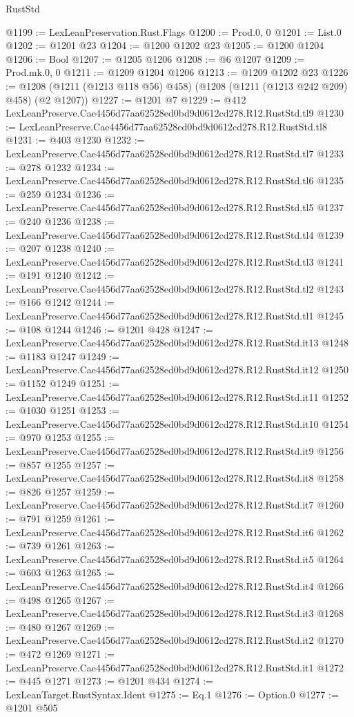 \begin{lexlean}{RustStd}
\begin{coremodule}
@1199 := LexLeanPreservation.Rust.Flags
@1200 := Prod.{0, 0}
@1201 := List.{0}
@1202 := @1201 @23
@1204 := @1200 @1202 @23
@1205 := @1200 @1204
@1206 := Bool
@1207 := @1205 @1206
@1208 := @6 @1207
@1209 := Prod.mk.{0, 0}
@1211 := @1209 @1204 @1206
@1213 := @1209 @1202 @23
@1226 := @1208 (@1211 (@1213 @118 @56) @458) (@1208 (@1211 (@1213 @242 @209) @458) (@2 @1207))
@1227 := @1201 @7
@1229 := @412 LexLeanPreserve.Cae4456d77aa62528ed0bd9d0612cd278.R12.RustStd.tl9
@1230 := LexLeanPreserve.Cae4456d77aa62528ed0bd9d0612cd278.R12.RustStd.tl8
@1231 := @403 @1230
@1232 := LexLeanPreserve.Cae4456d77aa62528ed0bd9d0612cd278.R12.RustStd.tl7
@1233 := @278 @1232
@1234 := LexLeanPreserve.Cae4456d77aa62528ed0bd9d0612cd278.R12.RustStd.tl6
@1235 := @259 @1234
@1236 := LexLeanPreserve.Cae4456d77aa62528ed0bd9d0612cd278.R12.RustStd.tl5
@1237 := @240 @1236
@1238 := LexLeanPreserve.Cae4456d77aa62528ed0bd9d0612cd278.R12.RustStd.tl4
@1239 := @207 @1238
@1240 := LexLeanPreserve.Cae4456d77aa62528ed0bd9d0612cd278.R12.RustStd.tl3
@1241 := @191 @1240
@1242 := LexLeanPreserve.Cae4456d77aa62528ed0bd9d0612cd278.R12.RustStd.tl2
@1243 := @166 @1242
@1244 := LexLeanPreserve.Cae4456d77aa62528ed0bd9d0612cd278.R12.RustStd.tl1
@1245 := @108 @1244
@1246 := @1201 @428
@1247 := LexLeanPreserve.Cae4456d77aa62528ed0bd9d0612cd278.R12.RustStd.it13
@1248 := @1183 @1247
@1249 := LexLeanPreserve.Cae4456d77aa62528ed0bd9d0612cd278.R12.RustStd.it12
@1250 := @1152 @1249
@1251 := LexLeanPreserve.Cae4456d77aa62528ed0bd9d0612cd278.R12.RustStd.it11
@1252 := @1030 @1251
@1253 := LexLeanPreserve.Cae4456d77aa62528ed0bd9d0612cd278.R12.RustStd.it10
@1254 := @970 @1253
@1255 := LexLeanPreserve.Cae4456d77aa62528ed0bd9d0612cd278.R12.RustStd.it9
@1256 := @857 @1255
@1257 := LexLeanPreserve.Cae4456d77aa62528ed0bd9d0612cd278.R12.RustStd.it8
@1258 := @826 @1257
@1259 := LexLeanPreserve.Cae4456d77aa62528ed0bd9d0612cd278.R12.RustStd.it7
@1260 := @791 @1259
@1261 := LexLeanPreserve.Cae4456d77aa62528ed0bd9d0612cd278.R12.RustStd.it6
@1262 := @739 @1261
@1263 := LexLeanPreserve.Cae4456d77aa62528ed0bd9d0612cd278.R12.RustStd.it5
@1264 := @603 @1263
@1265 := LexLeanPreserve.Cae4456d77aa62528ed0bd9d0612cd278.R12.RustStd.it4
@1266 := @498 @1265
@1267 := LexLeanPreserve.Cae4456d77aa62528ed0bd9d0612cd278.R12.RustStd.it3
@1268 := @480 @1267
@1269 := LexLeanPreserve.Cae4456d77aa62528ed0bd9d0612cd278.R12.RustStd.it2
@1270 := @472 @1269
@1271 := LexLeanPreserve.Cae4456d77aa62528ed0bd9d0612cd278.R12.RustStd.it1
@1272 := @445 @1271
@1273 := @1201 @434
@1274 := LexLeanTarget.RustSyntax.Ident
@1275 := Eq.{1}
@1276 := Option.{0}
@1277 := @1201 @505

\end{coremodule}
\end{lexlean}
